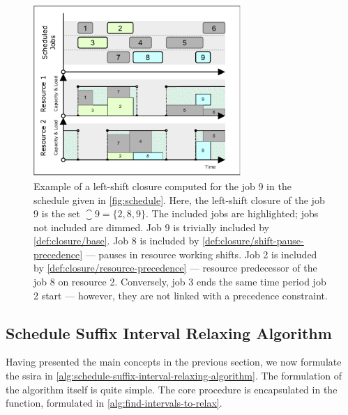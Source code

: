 \begin{figure}[p]
    \centering
    \includegraphics[width=0.7\textwidth]{img/Schedule-Closure.pdf}
    \caption{
        Example of a left-shift closure computed for the job 9 in the schedule given in \cref{fig:schedule}.
        Here, the left-shift closure of the job 9 is the set $\closure{9} = \{ 2, 8, 9 \}$.
        The included jobs are highlighted; jobs not included are dimmed.
        Job 9 is trivially included by \cref{def:closure/base}.
        Job 8 is included by \cref{def:closure/shift-pause-precedence} --- pauses in resource working shifts.
        Job 2 is included by \cref{def:closure/resource-precedence} --- resource predecessor of the job 8 on resource 2.
        Conversely, job 3 ends the same time period job 2 start --- however, they are not linked with a precedence constraint.
        }
    \label{fig:schedule-closure}
\end{figure}

\subsection{Schedule Suffix Interval Relaxing Algorithm} \label{subsec:extended-solution/schedule-suffix-interal-relaxing-algorithm}

Having presented the main concepts in the previous section,
we now formulate the \acf{ssira} in \cref{alg:schedule-suffix-interval-relaxing-algorithm}.
The formulation of the algorithm itself is quite simple.
The core procedure is encapsulated in the
 function,
formulated in \cref{alg:find-intervals-to-relax}.


